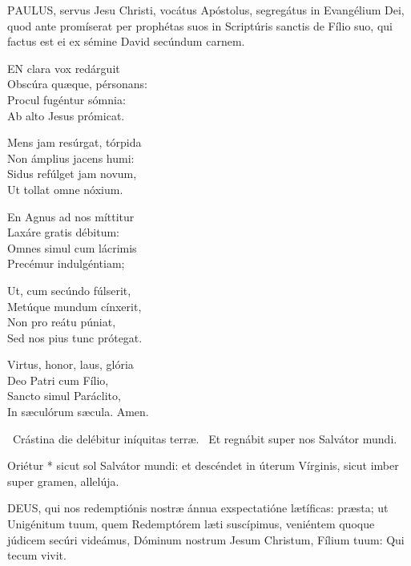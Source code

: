 
\lettrine[lines=2]{P}{AULUS}, servus Jesu Christi, vocátus Apóstolus, segregátus in Evangélium Dei, quod ante promíserat per prophétas suos in Scriptúris sanctis de Fílio suo, qui factus est ei ex sémine David secúndum carnem.


\lettrine[lines=2]{E}{N} clara vox redárguit\\
Obscúra quæque, pérsonans:\\
Procul fugéntur sómnia:\\
Ab alto Jesus prómicat.

Mens jam resúrgat, tórpida\\
Non ámplius jacens humi:\\
Sidus refúlget jam novum,\\
Ut tollat omne nóxium.

En Agnus ad nos míttitur\\
Laxáre gratis débitum:\\
Omnes simul cum lácrimis\\
Precémur indulgéntiam;

Ut, cum secúndo fúlserit,\\
Metúque mundum cínxerit,\\
Non pro reátu púniat,\\
Sed nos pius tunc prótegat.

Virtus, honor, laus, glória\\
Deo Patri cum Fílio,\\
Sancto simul Paráclito,\\
In sæculórum sæcula. Amen.

\V\ Crástina die delébitur iníquitas terræ. \R\ Et regnábit super nos Salvátor mundi.

 Oriétur * sicut sol Salvátor mundi: et descéndet in úterum Vírginis, sicut imber super gramen, allelúja.


\lettrine[lines=2]{D}{EUS}, qui nos redemptiónis nostræ ánnua exspectatióne lætíficas: præsta; ut Unigénitum tuum, quem Redemptórem læti suscípimus, veniéntem quoque júdicem secúri videámus, Dóminum nostrum Jesum Christum, Fílium tuum: Qui tecum vivit.



